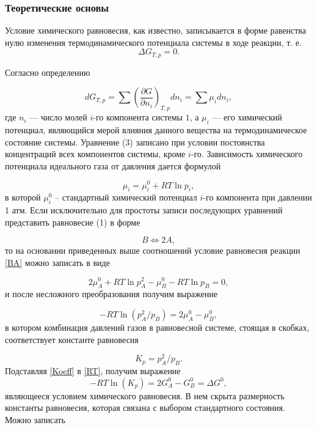 \documentclass[a4paper,12pt]{article} %
\begin{document}
\subsubsection*{Теоретические основы}
Условие химического равновесия, как известно, записывается в форме равенства нулю изменения термодинамического потенциала системы в ходе реакции, т. е.
\begin{equation}
 \Delta G_{T,p}  = 0.
\end{equation}	

Согласно определению

\begin{equation}
 dG_{T,p}  = \sum {(\frac{\partial G}{\partial n_i})_{T,p} dn_i = \sum {\mu_i dn_i}  },
\end{equation}	
где \(n_i\) — число молей \(i\)-го компонента системы \(1\), а \(\mu_i\) — его химический потенциал, являющийся мерой влияния данного вещества на термодинамическое состояние системы. Уравнение (3) записано при условии постоянства концентраций всех компонентов системы, кроме \(i\)-го. Зависимость химического потенциала идеального газа от давления дается формулой

\begin{equation}
 \mu_i = \mu_i^0 + RT \ln{p_i},
\end{equation}
в которой \( \mu_i^0 \) -- стандартный химический потенциал \(i\)-го компонента при давлении 1 атм.
Если исключительно для простоты записи последующих уравнений представить равновесие (1) в форме

\begin{equation}\label{BA}
 B \Leftrightarrow 2A,
\end{equation}
то на основании приведенных выше соотношений условие равновесия реакции \eqref{BA} можно записать в виде

\begin{equation}
 2 \mu_A^0 + RT \ln{p_A^2} - \mu_B^0 - RT \ln{p_B} = 0,
\end{equation}
и после несложного преобразования получим выражение

\begin{equation} \label{RT}
 -RT \ln(p_A^2 / p_B) = 2 \mu_A^0 - \mu_B^0,
\end{equation}
в котором комбинация давлений газов в равновесной системе, стоящая в скобках, соответствует константе равновесия

\begin{equation} \label{Koeff}
 K_p = p_A^2 / p_B.
\end{equation}
Подставляя \eqref{Koeff} в \eqref{RT}, получим выражение
\begin{equation}
 -RT \ln(K_p) =  2 G_A^0 - G_B^0 = \Delta G^0,
\end{equation}
являющееся условием химического равновесия. В нем скрыта размерность константы равновесия, которая связана с выбором стандартного состояния. Можно записать
\end{document}
